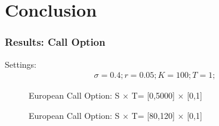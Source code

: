 \documentclass[blue]{beamer}
\begin{document}
\section{Conclusion}

\begin{frame}
\frametitle{Results: Call Option}
Settings:
\begin{align*}
\sigma = 0.4;
r = 0.05;
K = 100;
T = 1;
\end{align*}
\begin{figure}[H]
	\centering
	\begin{minipage}[t]{.45\linewidth}
		\caption{European Call Option: S $\times $ T= [0,5000] $\times $ [0,1]}
	\end{minipage}
	\begin{minipage}[t]{.45\linewidth}
		\caption{European Call Option: S $\times $ T= [80,120] $\times $ [0,1]}
	\end{minipage}
	\label{European_call_all}	
\end{figure}
\end{frame}
\end{document}
